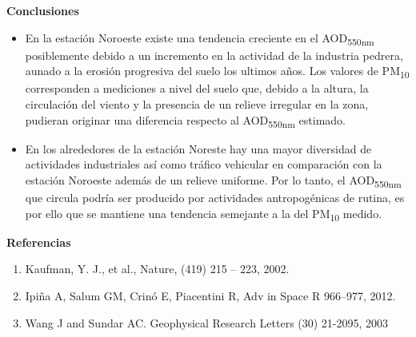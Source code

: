 \documentclass{article}
\begin{document}
\begin{minipage}{0.70\linewidth}
\begin{center}
\begin{shaded}
\textbf{\textcolor{ver}{Conclusiones}}
\end{shaded}
\end{center}
\begin{itemize}
    \item En la estación Noroeste existe una tendencia creciente en el AOD\textsubscript{550nm} posiblemente debido a un incremento en la actividad de la industria
    pedrera, aunado a la erosión progresiva del suelo los ultimos años. Los valores de PM\textsubscript{10} corresponden a mediciones a nivel del suelo que, debido a la altura,
     la circulación del viento y la presencia de un relieve irregular en la zona, pudieran originar una diferencia respecto al AOD\textsubscript{550nm} estimado.
     \item En los alrededores de la estación Noreste hay una mayor diversidad de actividades industriales
     así como tráfico vehicular en comparación con la estación Noroeste además de un relieve uniforme. Por lo tanto, el AOD\textsubscript{550nm} que
     circula podría ser producido por actividades antropogénicas de rutina, es por ello que se mantiene una tendencia
      semejante a la del PM\textsubscript{10} medido.
\end{itemize}
\end{minipage}
\hspace{0.8cm}
\begin{minipage}{0.25\linewidth}
\vspace*{-0.6cm}
\begin{center}
\begin{shaded}
\textbf{\textcolor{ver}{Referencias}}
\end{shaded}
\end{center}
\begin{enumerate}
    \item Kaufman, Y. J., et al., Nature, (419) 215 – 223, 2002.
    \item Ipiña A, Salum GM, Crinó E, Piacentini R, Adv in Space R 966–977, 2012.
    \item Wang J and Sundar AC. Geophysical Research Letters (30) 21-2095, 2003
\end{enumerate}
\end{minipage}
\end{document}

